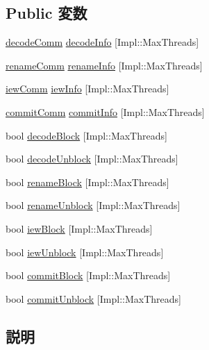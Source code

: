 \subsection*{Public 変数}
\begin{DoxyCompactItemize}
\item 
\hyperlink{structTimeBufStruct_1_1decodeComm}{decodeComm} \hyperlink{structTimeBufStruct_af215dd191ecd9a4b7e5635285704690a}{decodeInfo} \mbox{[}Impl::MaxThreads\mbox{]}
\item 
\hyperlink{structTimeBufStruct_1_1renameComm}{renameComm} \hyperlink{structTimeBufStruct_a9aadb85753df262a74edcd9a6f5c8735}{renameInfo} \mbox{[}Impl::MaxThreads\mbox{]}
\item 
\hyperlink{structTimeBufStruct_1_1iewComm}{iewComm} \hyperlink{structTimeBufStruct_a898f85599633ab431450fe791aeb0b4d}{iewInfo} \mbox{[}Impl::MaxThreads\mbox{]}
\item 
\hyperlink{structTimeBufStruct_1_1commitComm}{commitComm} \hyperlink{structTimeBufStruct_a00017f06df3e141cb5a9ab5bb64b9bae}{commitInfo} \mbox{[}Impl::MaxThreads\mbox{]}
\item 
bool \hyperlink{structTimeBufStruct_a37fbecdc2160421c24f03815d6c5fbf0}{decodeBlock} \mbox{[}Impl::MaxThreads\mbox{]}
\item 
bool \hyperlink{structTimeBufStruct_a235259108fda6460b35f4d3d2a7630c5}{decodeUnblock} \mbox{[}Impl::MaxThreads\mbox{]}
\item 
bool \hyperlink{structTimeBufStruct_aafde0fc1bba1f774a65de44feb7ef3f5}{renameBlock} \mbox{[}Impl::MaxThreads\mbox{]}
\item 
bool \hyperlink{structTimeBufStruct_a90edcda648198fd45bdf495a159c65e0}{renameUnblock} \mbox{[}Impl::MaxThreads\mbox{]}
\item 
bool \hyperlink{structTimeBufStruct_a648b3362f6977c243ba62db7f06a2788}{iewBlock} \mbox{[}Impl::MaxThreads\mbox{]}
\item 
bool \hyperlink{structTimeBufStruct_aa12d9fbdb77c719794157efc32244331}{iewUnblock} \mbox{[}Impl::MaxThreads\mbox{]}
\item 
bool \hyperlink{structTimeBufStruct_a5c4d4f5745c9950cd14ce633faea7f29}{commitBlock} \mbox{[}Impl::MaxThreads\mbox{]}
\item 
bool \hyperlink{structTimeBufStruct_ac417d2ad64fda7b8f055e9d9ab040d95}{commitUnblock} \mbox{[}Impl::MaxThreads\mbox{]}
\end{DoxyCompactItemize}


\subsection{説明}
